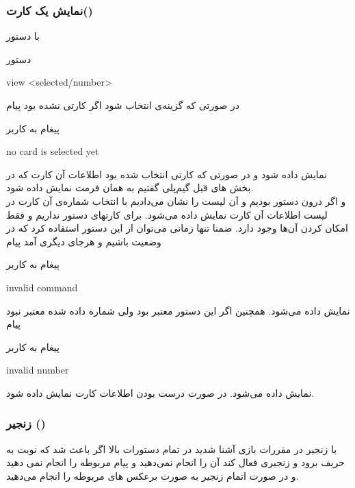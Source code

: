 \documentclass[]{article}
\begin{document}
\subsubsection*{{\titr نمایش یک کارت()}}
با دستور 
\begin{mybox}[colback=yellow]{دستور}
	\begin{latin}	
		view <selected/number>
	\end{latin}
\end{mybox}
    در صورتی که گزینه‌ی  انتخاب شود اگر کارتی  نشده 
    بود پیام
\begin{mybox}[colback=yellow]{پیغام به کاربر}
	\begin{latin}	
		no card is selected yet
	\end{latin}
\end{mybox}
نمایش داده شود و در صورتی که کارتی انتخاب شده بود اطلاعات آن کارت که در بخش 
های قبل گیم‌پلی گفتیم به همان فرمت نمایش داده شود.
\\
و اگر درون دستور  بودیم و آن لیست را نشان می‌دادیم با 
انتخاب شماره‌ی آن کارت در لیست اطلاعات آن کارت نمایش داده می‌شود. برای 
کارتهای 
 دستور  نداریم و فقط امکان  کردن آن‌ها وجود 
دارد. ضمنا تنها زمانی می‌توان از این دستور استفاده کرد که در وضعیت  
باشیم و هرجای دیگری  آمد پیام   
\begin{mybox}[colback=yellow]{پیغام به کاربر}
	\begin{latin}	
		invalid command 
	\end{latin}
\end{mybox}
نمایش داده می‌شود. همچنین اگر این دستور معتبر بود ولی شماره داده شده معتبر 
نبود پیام
\begin{mybox}[colback=yellow]{پیغام به کاربر}
	\begin{latin}	
	    invalid number	
	\end{latin}
\end{mybox}
نمایش داده می‌شود. در صورت درست بودن اطلاعات کارت نمایش داده شود.


\subsubsection*{{\titr زنجیر ()}}
با زنجیر در مقررات بازی آشنا شدید در تمام دستورات بالا اگر باعث شد که نوبت 
به حریف برود و زنجیری فعال کند آن  را انجام نمی‌دهید و پیام 
مربوطه 
را انجام نمی دهید و در صورت اتمام زنجیر به صورت برعکس  های 
مربوطه 
را انجام می‌دهید.
\end{document}
